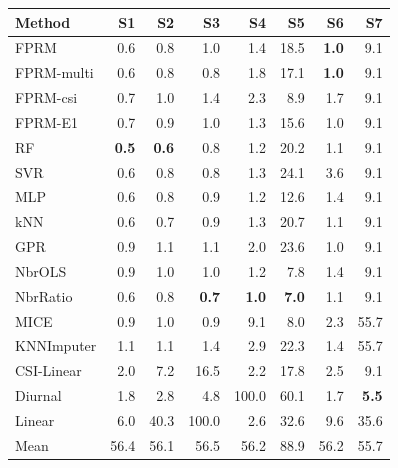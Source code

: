 \begin{tabular}{lrrrrrrr}
\toprule
Method & S1 & S2 & S3 & S4 & S5 & S6 & S7 \\
\midrule
FPRM & 0.6 & 0.8 & 1.0 & 1.4 & 18.5 & \textbf{1.0} & 9.1 \\
FPRM-multi & 0.6 & 0.8 & 0.8 & 1.8 & 17.1 & \textbf{1.0} & 9.1 \\
FPRM-csi & 0.7 & 1.0 & 1.4 & 2.3 & 8.9 & 1.7 & 9.1 \\
FPRM-E1 & 0.7 & 0.9 & 1.0 & 1.3 & 15.6 & 1.0 & 9.1 \\
\midrule
RF & \textbf{0.5} & \textbf{0.6} & 0.8 & 1.2 & 20.2 & 1.1 & 9.1 \\
SVR & 0.6 & 0.8 & 0.8 & 1.3 & 24.1 & 3.6 & 9.1 \\
MLP & 0.6 & 0.8 & 0.9 & 1.2 & 12.6 & 1.4 & 9.1 \\
kNN & 0.6 & 0.7 & 0.9 & 1.3 & 20.7 & 1.1 & 9.1 \\
GPR & 0.9 & 1.1 & 1.1 & 2.0 & 23.6 & 1.0 & 9.1 \\
\midrule
NbrOLS & 0.9 & 1.0 & 1.0 & 1.2 & 7.8 & 1.4 & 9.1 \\
NbrRatio & 0.6 & 0.8 & \textbf{0.7} & \textbf{1.0} & \textbf{7.0} & 1.1 & 9.1 \\
MICE & 0.9 & 1.0 & 0.9 & 9.1 & 8.0 & 2.3 & 55.7 \\
KNNImputer & 1.1 & 1.1 & 1.4 & 2.9 & 22.3 & 1.4 & 55.7 \\
\midrule
CSI-Linear & 2.0 & 7.2 & 16.5 & 2.2 & 17.8 & 2.5 & 9.1 \\
Diurnal & 1.8 & 2.8 & 4.8 & 100.0 & 60.1 & 1.7 & \textbf{5.5} \\
Linear & 6.0 & 40.3 & 100.0 & 2.6 & 32.6 & 9.6 & 35.6 \\
Mean & 56.4 & 56.1 & 56.5 & 56.2 & 88.9 & 56.2 & 55.7 \\
\bottomrule
\end{tabular}
